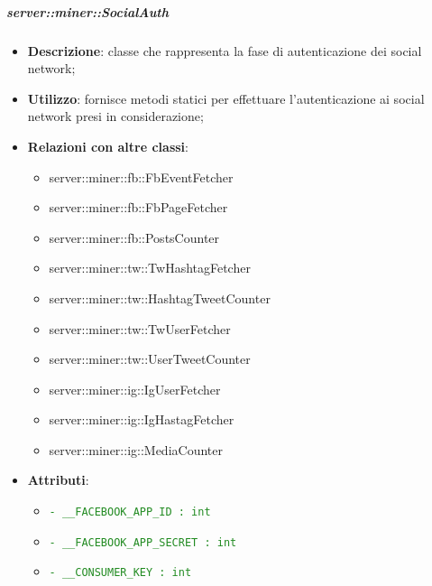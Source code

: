 		\subparagraph{server::miner::SocialAuth} %
		\label{subp:server_miner_SocialAuth}
				\begin{itemize}
				\item \textbf{Descrizione}: classe che rappresenta la fase di autenticazione dei social network;
				\item \textbf{Utilizzo}: fornisce metodi statici per effettuare l'autenticazione ai social network presi in considerazione;
				\item \textbf{Relazioni con altre classi}:
					\begin{itemize}
						\item server::miner::fb::FbEventFetcher
						\item server::miner::fb::FbPageFetcher
						\item server::miner::fb::PostsCounter
						\item server::miner::tw::TwHashtagFetcher
						\item server::miner::tw::HashtagTweetCounter
						\item server::miner::tw::TwUserFetcher
						\item server::miner::tw::UserTweetCounter
						\item server::miner::ig::IgUserFetcher
						\item server::miner::ig::IgHastagFetcher
						\item server::miner::ig::MediaCounter
					\end{itemize}
				\item \textbf{Attributi}:
					\begin{itemize}
						\item \textcolor{forestgreen}{\texttt{- \_\_FACEBOOK\_APP\_ID : int}}
						\item \textcolor{forestgreen}{\texttt{- \_\_FACEBOOK\_APP\_SECRET : int}}
						\item \textcolor{forestgreen}{\texttt{- \_\_CONSUMER\_KEY : int}}

\end{itemize}
\end{itemize}
